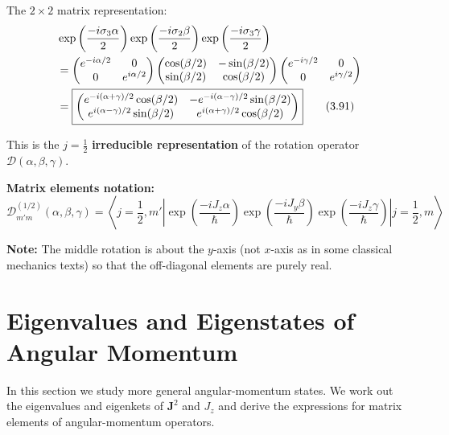 \documentclass[11pt,a4paper]{article}
\begin{document}
The $2 \times 2$ matrix representation:
\begin{align}
&\exp\left(\frac{-i\sigma_3\alpha}{2}\right)\exp\left(\frac{-i\sigma_2\beta}{2}\right)\exp\left(\frac{-i\sigma_3\gamma}{2}\right) \notag \\
&= \begin{pmatrix} e^{-i\alpha/2} & 0 \\ 0 & e^{i\alpha/2} \end{pmatrix}\begin{pmatrix} \cos(\beta/2) & -\sin(\beta/2) \\ \sin(\beta/2) & \cos(\beta/2) \end{pmatrix}\begin{pmatrix} e^{-i\gamma/2} & 0 \\ 0 & e^{i\gamma/2} \end{pmatrix} \notag \\
&= \boxed{\begin{pmatrix} e^{-i(\alpha+\gamma)/2}\cos(\beta/2) & -e^{-i(\alpha-\gamma)/2}\sin(\beta/2) \\ e^{i(\alpha-\gamma)/2}\sin(\beta/2) & e^{i(\alpha+\gamma)/2}\cos(\beta/2) \end{pmatrix}}
\tag{3.91}
\end{align}

This is the $j = \frac{1}{2}$ \textbf{irreducible representation} of the rotation operator $\mathscr{D}(\alpha, \beta, \gamma)$.

\textbf{Matrix elements notation:}
\begin{equation}
\mathscr{D}_{m'm}^{(1/2)}(\alpha, \beta, \gamma) = \left\langle j = \frac{1}{2}, m'\left|\exp\left(\frac{-iJ_z\alpha}{\hbar}\right)\exp\left(\frac{-iJ_y\beta}{\hbar}\right)\exp\left(\frac{-iJ_z\gamma}{\hbar}\right)\right|j = \frac{1}{2}, m\right\rangle
\tag{3.92}
\end{equation}

\textbf{Note:} The middle rotation is about the $y$-axis (not $x$-axis as in some classical mechanics texts) so that the off-diagonal elements are purely real.

\section{Eigenvalues and Eigenstates of Angular Momentum}

In this section we study more general angular-momentum states. We work out the eigenvalues and eigenkets of $\mathbf{J}^2$ and $J_z$ and derive the expressions for matrix elements of angular-momentum operators.
\end{document}
